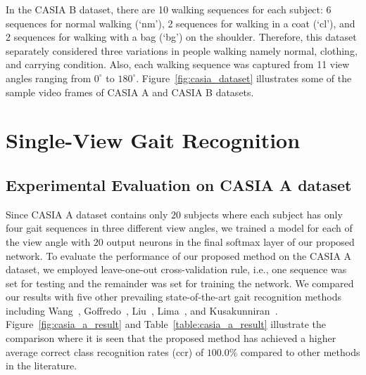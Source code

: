 \begin{itemize}
	In the CASIA B dataset, there are 10 walking sequences for each subject: 6 sequences for normal walking (\lq nm\rq), 2 sequences for walking in a coat (\lq cl\rq), and 2 sequences for walking with a bag (\lq bg\rq) on the shoulder. Therefore, this dataset separately considered three variations in people walking namely normal, clothing, and carrying condition. Also, each walking sequence was captured from 11 view angles ranging from ${0^{\circ}}$ to ${180^{\circ}}$. Figure~\ref{fig:casia_dataset} illustrates some of the sample video frames of CASIA A and CASIA B datasets.
\end{itemize}


\section{Single-View Gait Recognition} \label{sec:single_view}
\subsection{Experimental Evaluation on CASIA A dataset}
Since CASIA A dataset contains only $ 20 $ subjects where each subject has only four gait sequences in three different view angles, we trained a model for each of the view angle with $ 20 $ output neurons in the final softmax layer of our proposed network. To evaluate the performance of our proposed method on the CASIA A dataset, we employed leave-one-out cross-validation rule, i.e., one sequence was set for testing and the remainder was set for training the network. We compared our results with five other prevailing state-of-the-art gait recognition methods including Wang~\cite{Wang_03}, Goffredo~\cite{Goffredo_08}, Liu~\cite{Liu_16}, Lima~\cite{Lima_19}, and Kusakunniran~\cite{Kusakunniran_09}. Figure~\ref{fig:casia_a_result} and Table~\ref{table:casia_a_result} illustrate the comparison where it is seen that the proposed method has achieved a higher average correct class recognition rates (\gls{ccr}) of $100.0\%$ compared to other methods in the literature.

